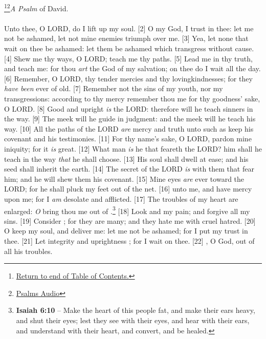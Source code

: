 \footnote{\textcolor[cmyk]{0.99998,1,0,0}{\hyperlink{TOC}{Return to end of Table of Contents.}}}\footnote{\href{https://www.audioverse.org/english/audiobibles/books/ENGKJV/O/Ps/1}{\textcolor[cmyk]{0.99998,1,0,0}{Psalms Audio}}}\textcolor[cmyk]{0.99998,1,0,0}{\emph{A Psalm} of David.}\\
\\
\textcolor[cmyk]{0.99998,1,0,0}{Unto thee, O LORD, do I lift up my soul.}
[2] \textcolor[cmyk]{0.99998,1,0,0}{O my God, I trust in thee: let me not be ashamed, let not mine enemies triumph over me.}
[3] \textcolor[cmyk]{0.99998,1,0,0}{Yea, let none that wait on thee be ashamed: let them be ashamed which transgress without cause.}
[4] \textcolor[cmyk]{0.99998,1,0,0}{Shew me thy ways, O LORD; teach me thy paths.}
[5] \textcolor[cmyk]{0.99998,1,0,0}{Lead me in thy truth, and teach me: for thou \emph{art} the God of my salvation; on thee do I wait all the day.}
[6] \textcolor[cmyk]{0.99998,1,0,0}{Remember, O LORD, thy tender mercies and thy lovingkindnesses; for they \emph{have} \emph{been} ever of old.}
[7] \textcolor[cmyk]{0.99998,1,0,0}{Remember not the sins of my youth, nor my transgressions: according to thy mercy remember thou me for thy goodness' sake, O LORD.}
[8] \textcolor[cmyk]{0.99998,1,0,0}{Good and upright \emph{is} the LORD: therefore will he teach sinners in the way.}
[9] \textcolor[cmyk]{0.99998,1,0,0}{The meek will he guide in judgment: and the meek will he teach his way.}
[10] \textcolor[cmyk]{0.99998,1,0,0}{All the paths of the LORD \emph{are} mercy and truth unto such as keep his covenant and his testimonies.}
[11] \textcolor[cmyk]{0.99998,1,0,0}{For thy name's sake, O LORD, pardon mine iniquity; for it \emph{is} great.}
[12] \textcolor[cmyk]{0.99998,1,0,0}{What man \emph{is} he that feareth the LORD? him shall he teach in the way \emph{that} he shall choose.}
[13] \textcolor[cmyk]{0.99998,1,0,0}{His soul shall dwell at ease; and his seed shall inherit the earth.}
[14] \textcolor[cmyk]{0.99998,1,0,0}{The secret of the LORD \emph{is} with them that fear him; and he will shew them his covenant.}
[15] \textcolor[cmyk]{0.99998,1,0,0}{Mine eyes \emph{are} ever toward the LORD; for he shall pluck my feet out of the net.}
[16] \textcolor[cmyk]{0.99998,1,0,0}{ unto me, and have mercy upon me; for I \emph{am} desolate and afflicted.}
[17] \textcolor[cmyk]{0.99998,1,0,0}{The troubles of my heart are enlarged: \emph{O} bring thou me out of .}\footnote{\textbf{Isaiah 6:10} -- Make the heart of this people fat, and make their ears heavy, and shut their eyes; lest they see with their eyes, and hear with their ears, and understand with their heart, and convert, and be healed.}
[18] \textcolor[cmyk]{0.99998,1,0,0}{Look  and my pain; and forgive all my sins.}
[19] \textcolor[cmyk]{0.99998,1,0,0}{Consider ; for they are many; and they hate me with cruel hatred.}
[20] \textcolor[cmyk]{0.99998,1,0,0}{O keep my soul, and deliver me: let me not be ashamed; for I put my trust in thee.}
[21] \textcolor[cmyk]{0.99998,1,0,0}{Let integrity and uprightness ; for I wait on thee.}
[22] \textcolor[cmyk]{0.99998,1,0,0}{, O God, out of all his troubles.}
